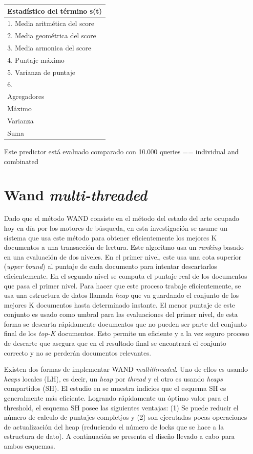\begin{tabular}{|l|}
\hline 
Estadístico del término s(t) \\ 
\hline 
1. Media aritmética del score \\ 
\hline 
2. Media geométrica del score \\ 
\hline 
3. Media armonica del score \\ 
\hline 
4. Puntaje máximo \\ 
\hline 
5. Varianza de puntaje \\ 
\hline 
6.  \\ 
\hline 
Agregadores \\ 
\hline 
Máximo \\ 
\hline 
Varianza \\ 
\hline 
Suma \\ 
\hline 
\end{tabular} 


Este predictor está evaluado comparado con 10.000 queries == individual and combinated


\section{Wand \textit{multi-threaded}}
\label{scheduling:wm}
Dado que el método WAND \citep{Broder:2003} consiste en el método del estado del arte ocupado hoy en día por los motores de búsqueda, en esta investigación se asume un sistema que usa este método para obtener eficientemente los mejores K documentos a una transacción de lectura. Este algoritmo usa un \textit{ranking} basado en una evaluación de dos niveles. En el primer nivel, este usa una cota superior (\textit{upper bound}) al puntaje de cada documento para intentar descartarlos eficientemente. En el segundo nivel se computa el puntaje real de los documentos que pasa el primer nivel. Para hacer que este proceso trabaje eficientemente, se usa una estructura de datos llamada \textit{heap} que va guardando el conjunto de los mejores K documentos hasta determinado instante. El menor puntaje de este conjunto es usado como umbral para las evaluaciones del primer nivel, de esta forma se descarta rápidamente documentos que no pueden ser parte del conjunto final de los \textit{top-K} documentos. Esto permite un eficiente y a la vez seguro proceso de descarte que asegura que en el resultado final se encontrará el conjunto correcto y no se perderán documentos relevantes.

Existen dos formas de implementar WAND \textit{multithreaded}. Uno de ellos es usando \textit{heaps} locales (LH), es decir, un \textit{heap} por \textit{thread} y el otro es usando \textit{heaps} compartidos (SH). El estudio en \citep{Rojas:2013} se muestra indicios que el esquema SH es generalmente más eficiente. Logrando rápidamente un óptimo valor para el threshold, el esquema SH posee las siguientes ventajas: (1) Se puede reducir el número de calculo de puntajes completjos y (2) son ejecutadas pocas operaciones de actualización del heap (reduciendo el número de locks que se hace a la estructura de dato). A continuación se presenta el diseño llevado a cabo para ambos esquemas.


